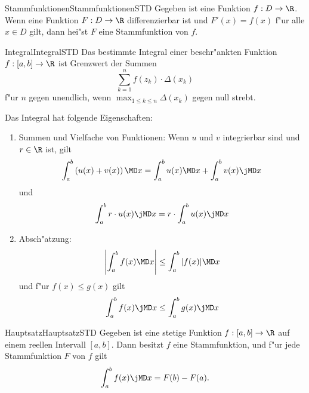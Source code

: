 

\begin{MXContent}{Stammfunktionen}{Stammfunktionen}{STD}
Gegeben ist eine Funktion $f: D \rightarrow \R$. 
Wenn eine Funktion $F: D  \rightarrow \R$ differenzierbar ist und $F'(x) = f(x)$ 
f"ur alle $x \in D$ gilt, dann hei"st $F$ eine Stammfunktion von $f$.
\end{MXContent}


\begin{MXContent}{Integral}{Integral}{STD}
Das bestimmte Integral einer beschr"ankten Funktion $f: [a, b] \rightarrow \R$ 
ist Grenzwert der Summen
\[
\sum_{k=1}^n f(z_k) \cdot \Delta(x_k) %
\]
f"ur $n$ gegen unendlich, wenn $\max_{1 \leq k \leq n} \Delta(x_k)$ gegen null 
strebt.

Das Integral hat folgende Eigenschaften:
\begin{enumerate}
\item Summen und Vielfache von Funktionen: 
Wenn $u$ und $v$ integrierbar sind und $r \in \R$ ist, gilt
\[
\int_{a}^b \left( u(x) + v(x) \right) \MD x %
= \int_a^b u(x) \MD x + \int_a^b v(x) \jMD x %
\]
und
\[
\int_{a}^b r \cdot u(x) \jMD x %
= r \cdot \int_a^b u(x) \jMD x %
\]
%
\item Absch"atzung:
\[
\left|\int_{a}^b f(x) \MD x\right| \leq \int_a^b |f(x)| \MD x %
\]
und f"ur $f(x) \leq g(x)$ gilt
\[
\int_{a}^b f(x) \jMD x \leq \int_a^b g(x) \jMD x %
\]
\end{enumerate}
\end{MXContent}


\begin{MXContent}{Hauptsatz}{Hauptsatz}{STD}
Gegeben ist eine stetige Funktion $f: [a, b] \rightarrow \R$ auf einem 
reellen Intervall $[a, b]$. 
Dann besitzt $f$ eine Stammfunktion, und f"ur jede Stammfunktion $F$ von $f$ 
gilt
\[
\int_{a}^b f(x) \jMD x = F(b) - F(a). %
\]
\end{MXContent}


